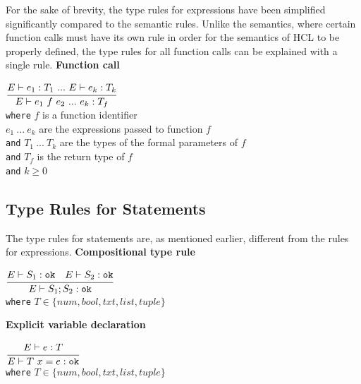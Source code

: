 For the sake of brevity, the type rules for expressions have been simplified significantly compared to the semantic rules.
Unlike the semantics, where certain function calls must have its own rule in order for the semantics of HCL to be properly defined, the type rules for all function calls can be explained with a single rule.
\textbf{Function call}\\
\begin{center}
	\begin{math}
		\cfrac
		{E \vdash e_1 : T_1 \ .
		.
		.
		\ E \vdash e_k : T_k}
		{E \vdash e_1\ f\ e_2 \ .
		.
		.
		\ e_k : T_f}
	\end{math}
	\\[1\baselineskip]
	\texttt{where} $f$ is a function identifier\\
	$e_1\ .
	.
	.
	\ e_k$ are the expressions passed to function $f$\\
	\texttt{and} $T_1\ .
	.
	.
	\ T_k$ are the types of the formal parameters of $f$\\
	\texttt{and} $T_f$ is the return type of $f$\\
	\texttt{and} $k \ge 0$
\end{center}



\subsection{Type Rules for Statements}
The type rules for statements are, as mentioned earlier, different from the rules for expressions.
\textbf{Compositional type rule}\\
\begin{center}
	\begin{math}
	\cfrac
	{E \vdash S_1 : \texttt{ok}\quad E \vdash S_2 : \texttt{ok}}
	{E \vdash S_1;S_2 : \texttt{ok}}
	\end{math}
	\\[1\baselineskip]
	\texttt{where} $T \in \{num, bool, txt, list, tuple\}$
\end{center}


\textbf{Explicit variable declaration}\\
\begin{center}
	\begin{math}
		\cfrac
		{E \vdash e : T}
		{E \vdash T\ x = e : \texttt{ok}}
	\end{math}
	\\[1\baselineskip]
	\texttt{where} $T \in \{num, bool, txt, list, tuple\}$
\end{center}

